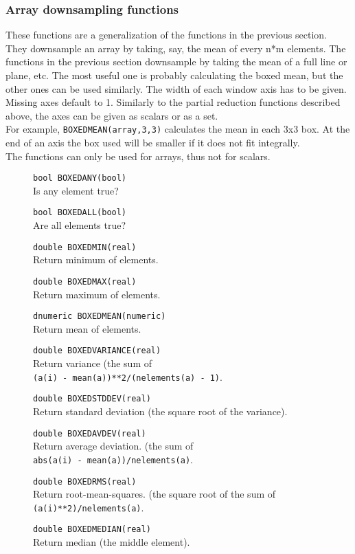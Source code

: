 \subsubsection{Array downsampling functions}
These functions are a generalization of the functions in the previous
section. They downsample an array by taking, say, the mean of every
n*m elements. The functions in the previous section downsample by
taking the mean of a full line or plane, etc.
The most useful one is probably calculating the boxed mean, but
the other ones can be used similarly.
The width of each window axis has to be given. Missing axes default to 1.
Similarly to the partial reduction functions described above, the axes
can be given as scalars or as a set.
\\For example,
\texttt{BOXEDMEAN(array,3,3)} calculates the mean
in each 3x3 box. At the end of an axis the box used will be smaller
if it does not fit integrally.
\\The functions can only be used for arrays, thus not for scalars.
\begin{description}
  \item[] \texttt{bool BOXEDANY(bool)}\\
    Is any element true?
  \item[] \texttt{bool BOXEDALL(bool)}\\
    Are all elements true?
  \item[] \texttt{double BOXEDMIN(real)}\\
    Return minimum of elements.
  \item[] \texttt{double BOXEDMAX(real)}\\
    Return maximum of elements.
  \item[] \texttt{dnumeric BOXEDMEAN(numeric)}\\
    Return mean of elements.
  \item[] \texttt{double BOXEDVARIANCE(real)}\\
    Return variance (the sum of
    \\\texttt{(a(i) - mean(a))**2/(nelements(a) - 1)}.
  \item[] \texttt{double BOXEDSTDDEV(real)}\\
    Return standard deviation (the square root of the variance).
  \item[] \texttt{double BOXEDAVDEV(real)}\\
    Return average deviation. (the sum of 
    \\\texttt{abs(a(i) - mean(a))/nelements(a)}.
  \item[] \texttt{double BOXEDRMS(real)}\\
    Return root-mean-squares. (the square root of the sum of
    \\\texttt{(a(i)**2)/nelements(a)}.
  \item[] \texttt{double BOXEDMEDIAN(real)}\\
    Return median (the middle element).
\end{description}

